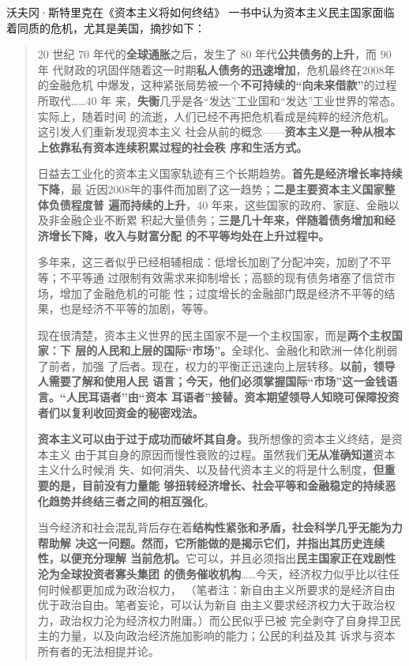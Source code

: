 沃夫冈·斯特里克在《资本主义将如何终结》\cite{JJDK201504024}\cite{streeck2017will}
一书中认为资本主义民主国家面临着同质的危机，尤其是美国，摘抄如下：

\begin{quotation}
  20 世纪 70 年代的\textbf{全球通胀}之后，发生了 80 年代\textbf{公共债务的上升}，而 90 年
  代财政的巩固伴随着这一时期\textbf{私人债务的迅速增加}，危机最终在2008年的金融危机
  中爆发，这种紧张局势被一个\textbf{不可持续的“向未来借款”}的过程所取代……40 年
  来，\textbf{失衡}几乎是各“发达”工业国和“发达”工业世界的常态。实际上，随着时间
  的流逝，人们已经不再把危机看成是纯粹的经济危机。这引发人们重新发现资本主义
  社会从前的概念——\textbf{资本主义是一种从根本上依靠私有资本连续积累过程的社会秩
    序和生活方式。}

  日益去工业化的资本主义国家轨迹有三个长期趋势。\textbf{首先是经济增长率持续下降}，最
  近因2008年的事件而加剧了这一趋势；\textbf{二是主要资本主义国家整体负债程度普
    遍而持续的上升}，40 年来，这些国家的政府、家庭、金融以及非金融企业不断累
  积起大量债务；\textbf{三是几十年来，伴随着债务增加和经济增长下降，收入与财富分配
    的不平等均处在上升过程中。}

  多年来，这三者似乎已经相辅相成：低增长加剧了分配冲突，加剧了不平等；不平等通
  过限制有效需求来抑制增长；高额的现有债务堵塞了信贷市场，增加了金融危机的可能
  性；过度增长的金融部门既是经济不平等的结果，也是经济不平等的加剧，等等。

  现在很清楚，资本主义世界的民主国家不是一个主权国家，而是\textbf{两个主权国家：下
    层的人民和上层的国际“市场”。}全球化、金融化和欧洲一体化削弱了前者，加强
  了后者。现在，权力的平衡正迅速向上层转移。\textbf{以前，领导人需要了解和使用人民
    语言；今天，他们必须掌握国际“市场”这一金钱语言。“人民耳语者”由“资本
    耳语者”接替。资本期望领导人知晓可保障投资者们以复利收回资金的秘密戏法。}

  \textbf{资本主义可以由于过于成功而破坏其自身。}我所想像的资本主义终结，是资本主义
  由于其自身的原因而慢性衰败的过程。虽然我们\textbf{无从准确知道}资本主义什么时候消
  失、如何消失、以及替代资本主义的将是什么制度，\textbf{但重要的是，目前没有力量能
    够扭转经济增长、社会平等和金融稳定的持续恶化趋势并终结三者之间的相互强化}。

  当今经济和社会混乱背后存在着\textbf{结构性紧张和矛盾，社会科学几乎无能为力帮助解
    决这一问题。然而，它所能做的是揭示它们，并指出其历史连续性，以便充分理解
    当前危机。}它可以，并且必须指出\textbf{民主国家正在戏剧性沦为全球投资者寡头集团
    的债务催收机构}……今天，经济权力似乎比以往任何时候都更加成为政治权力，
  （笔者注：新自由主义所要求的是经济自由优于政治自由。笔者妄论，可以认为新自
  由主义要求经济权力大于政治权力，政治权力沦为经济权力附庸。）而公民似乎已被
  完全剥夺了自身捍卫民主的力量，以及向政治经济施加影响的能力；公民的利益及其
  诉求与资本所有者的无法相提并论。


\end{quotation}
